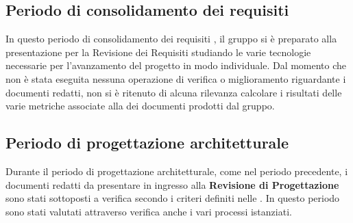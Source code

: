 \subsection{Periodo di consolidamento dei requisiti}
In questo periodo di consolidamento dei requisiti , il gruppo {\Gruppo} si è preparato alla presentazione per la Revisione dei Requisiti studiando le varie tecnologie necessarie per l'avanzamento del progetto in modo individuale. Dal momento che non è stata eseguita nessuna operazione di verifica o miglioramento riguardante i documenti redatti, non si è ritenuto di alcuna rilevanza calcolare i risultati delle varie metriche associate alla  dei documenti prodotti dal gruppo.
 
\subsection{Periodo di progettazione architetturale}
Durante il periodo di progettazione architetturale, come nel periodo precedente, i documenti redatti da presentare in ingresso alla \textbf{Revisione di Progettazione} sono stati sottoposti a verifica secondo i criteri definiti nelle . In questo periodo sono stati valutati attraverso verifica anche i vari processi istanziati.
